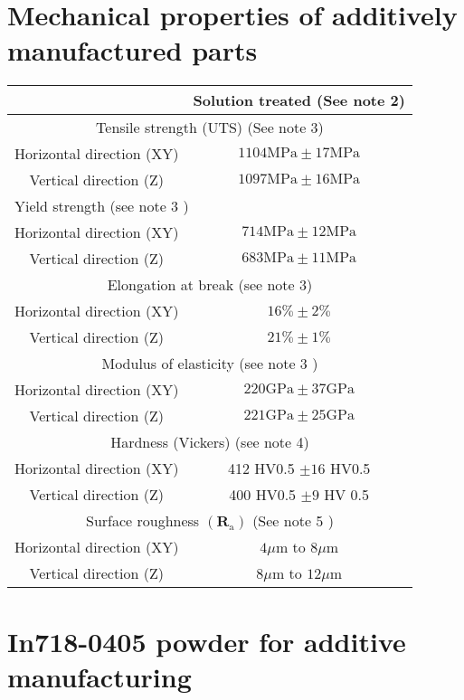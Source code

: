 \documentclass[10pt]{article}
\begin{document}
\section*{Mechanical properties of additively manufactured parts}
\begin{center}
\begin{tabular}{|c|c|}
\hline
 & Solution treated (See note 2) \\
\hline
\multicolumn{2}{|c|}{Tensile strength (UTS) (See note 3)} \\
\hline
Horizontal direction (XY) & $1104 \mathrm{MPa} \pm 17 \mathrm{MPa}$ \\
\hline
Vertical direction (Z) & $1097 \mathrm{MPa} \pm 16 \mathrm{MPa}$ \\
\hline
\multicolumn{2}{|l|}{Yield strength (see note 3 )} \\
\hline
Horizontal direction (XY) & $714 \mathrm{MPa} \pm 12 \mathrm{MPa}$ \\
\hline
Vertical direction (Z) & $683 \mathrm{MPa} \pm 11 \mathrm{MPa}$ \\
\hline
\multicolumn{2}{|c|}{Elongation at break (see note 3)} \\
\hline
Horizontal direction (XY) & $16 \% \pm 2 \%$ \\
\hline
Vertical direction (Z) & $21 \% \pm 1 \%$ \\
\hline
\multicolumn{2}{|c|}{Modulus of elasticity (see note 3 )} \\
\hline
Horizontal direction (XY) & $220 \mathrm{GPa} \pm 37 \mathrm{GPa}$ \\
\hline
Vertical direction (Z) & $221 \mathrm{GPa} \pm 25 \mathrm{GPa}$ \\
\hline
\multicolumn{2}{|c|}{Hardness (Vickers) (see note 4)} \\
\hline
Horizontal direction (XY) & 412 HV0.5 $\pm 16$ HV0.5 \\
\hline
Vertical direction (Z) & 400 HV0.5 $\pm 9$ HV 0.5 \\
\hline
\multicolumn{2}{|c|}{Surface roughness $\left(\mathbf{R}_{\mathrm{a}}\right)$ (See note 5 )} \\
\hline
Horizontal direction (XY) & $4 \mu \mathrm{m}$ to $8 \mu \mathrm{m}$ \\
\hline
Vertical direction (Z) & $8 \mu \mathrm{m}$ to $12 \mu \mathrm{m}$ \\
\hline
\end{tabular}
\end{center}

\section*{In718-0405 powder for additive manufacturing}
\end{document}
